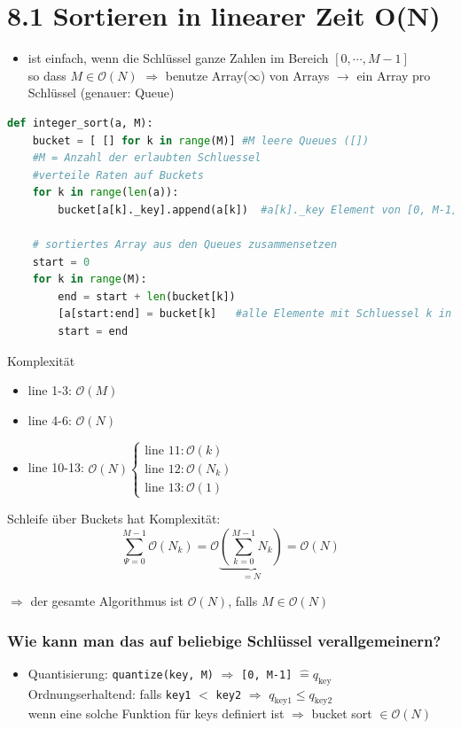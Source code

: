 \documentclass[11pt, fleqn]{scrreprt}
\begin{document}
\section*{8.1 Sortieren in linearer Zeit O(N)}
\begin{itemize}
	\item ist einfach, wenn die Schlüssel ganze Zahlen im Bereich $[0, \cdots, M-1]$ \\
	so dass $M \in \mathcal{O}(N)$ $\Rightarrow$ benutze Array($\infty$) von Arrays $\rightarrow$ ein Array pro Schlüssel (genauer: Queue)
\end{itemize}
\begin{lstlisting}[language=Python]
def integer_sort(a, M):
	bucket = [ [] for k in range(M)] #M leere Queues ([])
	#M = Anzahl der erlaubten Schluessel
	#verteile Raten auf Buckets
	for k in range(len(a)):
		bucket[a[k]._key].append(a[k])	#a[k]._key Element von [0, M-1]
	
	# sortiertes Array aus den Queues zusammensetzen
	start = 0
	for k in range(M):
		end = start + len(bucket[k])
		[a[start:end] = bucket[k]	#alle Elemente mit Schluessel k in a sortiert einfuegen
		start = end
\end{lstlisting}
Komplexität
\begin{itemize}
	\item line 1-3: $\mathcal{O}(M)$
	\item line 4-6: $\mathcal{O}(N)$
	\item line 10-13: $\mathcal{O}(N) \begin{cases} \text{line 11}: \mathcal{O}(k) \\ \text{line 12}: \mathcal{O}(N_k) \\ \text{line 13}: \mathcal{O}(1) \end{cases}$
\end{itemize}
Schleife über Buckets hat Komplexität: \[\sum_{\Psi = 0}^{M-1} \mathcal{O}(N_k) = \mathcal{O}\underbrace{\left(\sum_{k = 0}^{M-1}N_k\right)}_{=N} = \mathcal{O}(N)\]

$\Rightarrow$ der gesamte Algorithmus ist $\mathcal{O}(N)$, falls $M \in \mathcal{O}(N)$ \\

\subsubsection*{Wie kann man das auf beliebige Schlüssel verallgemeinern?}
\begin{itemize}
\item Quantisierung: \verb|quantize(key, M)| $\Rightarrow$ \verb|[0, M-1]| $\widehat{=} q_{\text{key}}$ \\
\hspace*{0.1cm} Ordnungserhaltend: falls \verb|key1| $<$ \verb|key2| $\Rightarrow$ $q_{\text{key1}} \leq q_{\text{key2}}$ \\
wenn eine solche Funktion für keys definiert ist $\Rightarrow$ bucket sort $\in \mathcal{O}(N)$
\end{itemize}
\end{document}
